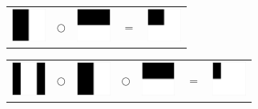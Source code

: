 \documentclass[11pt,dvipsnames]{article} %
\newcommand{\1}{\mathds{1}}
\begin{document}
\begin{itemize}
\hfill
\begin{tabular}{m{0.8cm} m{.1cm} m{0.8cm} m{.05cm} m{0.8cm}}
\includegraphics[height=1.1cm]{E2}  
& $\bigcirc$ 
& \includegraphics[height=1.1cm]{E5} 
& $=$
& \includegraphics[height=1.1cm]{E2E5} 
\end{tabular} \hspace{1.3cm}

\hfill
\begin{tabular}{m{0.8cm} m{.1cm} m{0.8cm} m{.1cm} m{0.8cm} m{.1cm} m{0.8cm}}
\includegraphics[height=1.1cm]{E4}
& $\bigcirc$ 
& \includegraphics[height=1.1cm]{E2}  
& $\bigcirc$ 
& \includegraphics[height=1.1cm]{E5} 
& $=$
& \includegraphics[height=1.1cm]{E4E2E5} 
\end{tabular} \hspace{1.3cm}


\end{itemize}
\end{document}
